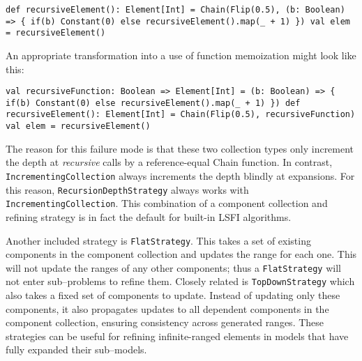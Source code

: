 \begin{flushleft}
\texttt{def recursiveElement(): Element[Int] = Chain(Flip(0.5),
\newline\tab (b: Boolean) => \{
\newline\tab\tab if(b) Constant(0)
\newline\tab\tab else recursiveElement().map(\_ + 1)
\newline\tab \})
\newline val elem = recursiveElement()
}
\end{flushleft}

An appropriate transformation into a use of function memoization might look like this:

\begin{flushleft}
\texttt{val recursiveFunction: Boolean => Element[Int] =
\newline\tab (b: Boolean) => \{
\newline\tab\tab if(b) Constant(0)
\newline\tab\tab else recursiveElement().map(\_ + 1)
\newline\tab \})
\newline def recursiveElement(): Element[Int] = Chain(Flip(0.5),
\newline\tab recursiveFunction)
\newline val elem = recursiveElement()
}
\end{flushleft}

The reason for this failure mode is that these two collection types only increment the depth at \textit{recursive} calls by a reference-equal Chain function. In contrast, \texttt{IncrementingCollection} always increments the depth blindly at expansions. For this reason, \texttt{RecursionDepthStrategy} always works with \texttt{IncrementingCollection}. This combination of a component collection and refining strategy is in fact the default for built-in LSFI algorithms.

Another included strategy is \texttt{FlatStrategy}. This takes a set of existing components in the component collection and updates the range for each one. This will not update the ranges of any other components; thus a \texttt{FlatStrategy} will not enter sub--problems to refine them. Closely related is \texttt{TopDownStrategy} which also takes a fixed set of components to update. Instead of updating only these components, it also propagates updates to all dependent components in the component collection, ensuring consistency across generated ranges. These strategies can be useful for refining infinite-ranged elements in models that have fully expanded their sub--models.

